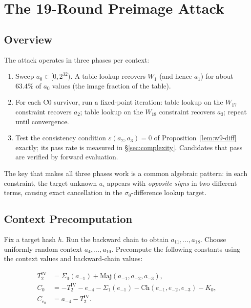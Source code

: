 \documentclass[11pt,a4paper]{article}
\newcommand{\Sig}[1]{\Sigma_{#1}}
\newcommand{\Maj}{\mathrm{Maj}}
\newcommand{\Ch}{\mathrm{Ch}}
\begin{document}
\section{The 19-Round Preimage Attack}
\label{sec:attack}

\subsection{Overview}

The attack operates in three phases per context:

\begin{enumerate}
  \item[\textbf{C0.}] Sweep $a_0 \in [0, 2^{32})$.  A table lookup
    recovers $W_1$ (and hence $a_1$) for about $63.4\%$ of $a_0$ values (the image fraction of the table).
  \item[\textbf{C1/C2.}] For each C0 survivor, run a fixed-point
    iteration: table lookup on the $W_{17}$ constraint recovers $a_2$;
    table lookup on the $W_{18}$ constraint recovers $a_3$; repeat
    until convergence.
  \item[\textbf{W9 filter.}] Test the consistency condition
    $\varepsilon(a_2,a_3)=0$ of Proposition~\ref{lem:w9-diff} exactly; its
    pass rate is measured in \S\ref{sec:complexity}.  Candidates that pass
    are verified by forward evaluation.
\end{enumerate}

The key that makes all three phases work is a common algebraic pattern:
in each constraint, the target unknown $a_i$ appears with \emph{opposite
signs} in two different terms, causing exact cancellation in the
$\sigma_0$-difference lookup target.

\subsection{Context Precomputation}

Fix a target hash $h$.  Run the backward chain to obtain
$a_{11},\ldots,a_{18}$.  Choose uniformly random context
$a_4,\ldots,a_{10}$.  Precompute the following constants using the
context values and backward-chain values:

\begin{align}
  T_2^{\mathrm{IV}} &= \Sig{0}(a_{-1}) + \Maj(a_{-1},a_{-2},a_{-3}),
  \label{eq:T2iv} \\
  C_0 &= {-T_2^{\mathrm{IV}} - e_{-4} - \Sig{1}(e_{-1})
          - \Ch(e_{-1},e_{-2},e_{-3}) - K_0}, \label{eq:C0const} \\
  C_{e_0} &= {a_{-4} - T_2^{\mathrm{IV}}}.  \label{eq:Ce0}
\end{align}
\end{document}
